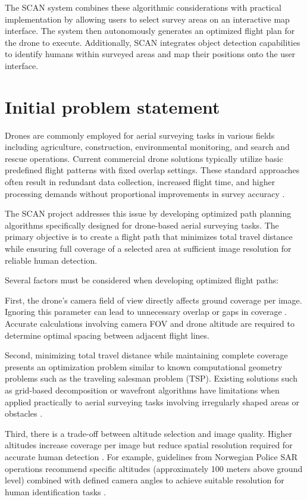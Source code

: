 The SCAN system combines these algorithmic considerations with practical implementation by allowing users to select survey areas on an interactive map interface. The system then autonomously generates an optimized flight plan for the drone to execute. Additionally, SCAN integrates object detection capabilities to identify humans within surveyed areas and map their positions onto the user interface.

\section{Initial problem statement}

Drones are commonly employed for aerial surveying tasks in various fields including agriculture, construction, environmental monitoring, and search and rescue operations. Current commercial drone solutions typically utilize basic predefined flight patterns with fixed overlap settings. These standard approaches often result in redundant data collection, increased flight time, and higher processing demands without proportional improvements in survey accuracy \cite{AerotasOverlap}.

The SCAN project addresses this issue by developing optimized path planning algorithms specifically designed for drone-based aerial surveying tasks. The primary objective is to create a flight path that minimizes total travel distance while ensuring full coverage of a selected area at sufficient image resolution for reliable human detection.

Several factors must be considered when developing optimized flight paths:

First, the drone's camera field of view directly affects ground coverage per image. Ignoring this parameter can lead to unnecessary overlap or gaps in coverage \cite{UAVCoveragePDF}. Accurate calculations involving camera FOV and drone altitude are required to determine optimal spacing between adjacent flight lines.

Second, minimizing total travel distance while maintaining complete coverage presents an optimization problem similar to known computational geometry problems such as the traveling salesman problem (TSP). Existing solutions such as grid-based decomposition or wavefront algorithms have limitations when applied practically to aerial surveying tasks involving irregularly shaped areas or obstacles \cite{SmoothCoverage}.

Third, there is a trade-off between altitude selection and image quality. Higher altitudes increase coverage per image but reduce spatial resolution required for accurate human detection \cite{OptimizationUAV}. For example, guidelines from Norwegian Police SAR operations recommend specific altitudes (approximately 100 meters above ground level) combined with defined camera angles to achieve suitable resolution for human identification tasks \cite{NorwegianPolice}.

